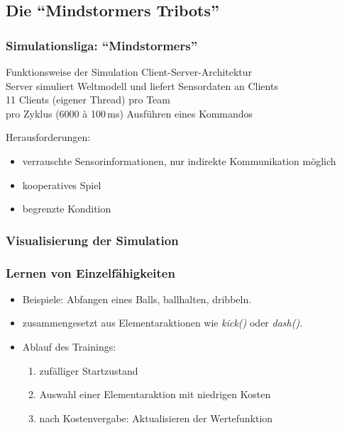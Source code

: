 \subsection{Die "`Mindstormers Tribots"'}
\begin{frame}
  \frametitle{Simulationsliga: "`Mindstormers"'}
  
  \begin{block}{Funktionsweise der Simulation}
      Client-Server-Architektur\\
      Server simuliert Weltmodell und liefert Sensordaten an Clients\\
      11 Clients (eigener Thread) pro Team\\
      pro Zyklus (6000 à 100\,ms) Ausführen eines Kommandos
  \end{block}

  Herausforderungen:  
  \begin{itemize}
    \item verrauschte Sensorinformationen, nur indirekte Kommunikation möglich
    \item kooperatives Spiel
    \item begrenzte Kondition
  \end{itemize}
  
\end{frame}

\begin{frame}
  \frametitle{Visualisierung der Simulation}
  \begin{center}
  \end{center}
\end{frame}

\begin{frame}
  \frametitle{Lernen von Einzelfähigkeiten}
  
  \begin{itemize}
    \item Beispiele: Abfangen eines Balls, ballhalten, dribbeln.
    \item zusammengesetzt aus Elementaraktionen wie \textsl{kick()} oder
    \textsl{dash()}. 
    \item Ablauf des Trainings:
	\begin{enumerate}
      \item zufälliger Startzustand
      \item Auswahl einer Elementaraktion mit niedrigen Kosten
      \item nach Kostenvergabe: Aktualisieren der Wertefunktion
    \end{enumerate}
  \end{itemize}
\end{frame}